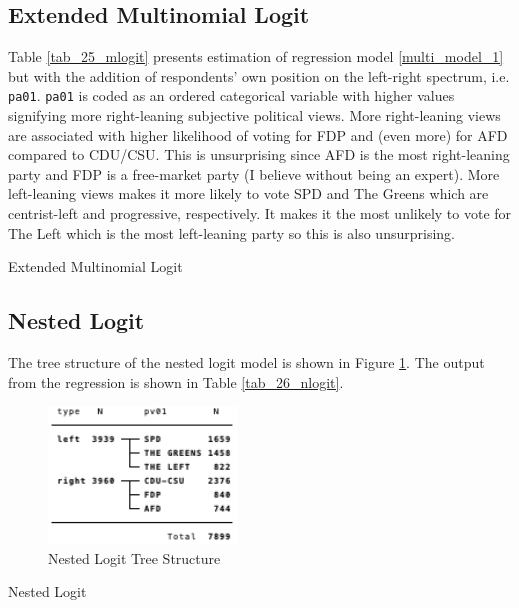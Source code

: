     
    \subsection{Extended Multinomial Logit}
        Table \ref{tab_25_mlogit} presents estimation of regression model \eqref{multi_model_1} but with the addition of respondents’ own position on the left-right spectrum, i.e. \texttt{pa01}. \texttt{pa01} is coded as an ordered categorical variable with higher values signifying more right-leaning subjective political views. 
            \newline\indent
        More right-leaning views are associated with higher likelihood of voting for FDP and (even more) for AFD compared to CDU/CSU. This is unsurprising since AFD is the most right-leaning party and FDP is a free-market party (I believe without being an expert). 
            \newline\indent
        More left-leaning views makes it more likely to vote SPD and The Greens which are centrist-left and progressive, respectively. It makes it the most unlikely to vote for The Left which is the most left-leaning party so this is also unsurprising.
            \begin{landscape}
                        \begin{table}[]
                            \footnotesize
                            \centering
                            
                            \caption{Extended Multinomial Logit}
                            \label{tab_25_mlogit}
                        \end{table}
                \end{landscape}
    
    
    \subsection{Nested Logit}
    The tree structure of the nested logit model is shown in Figure \ref{fig_27_tree}. The output from the regression is shown in Table \ref{tab_26_nlogit}.
        \begin{figure}[!htb]
                \centering
                \includegraphics[width=5cm]{figs/27_tree}
                \caption{Nested Logit Tree Structure}
                \label{fig_27_tree}
            \end{figure} 
            \begin{landscape}
                \begin{table}[]
                    \scriptsize
                    \centering
                    
                    \caption{Nested Logit}
                    \label{tab_26_nlogit}
                \end{table}
            \end{landscape}
            
